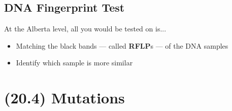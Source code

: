 \documentclass[a4paper,12pt]{article}
\begin{document}
\subsection{DNA Fingerprint Test}
At the Alberta level, all you would be tested on is...
\begin{itemize}
    \item{Matching the black bands --- called \textbf{RFLP}s --- of the DNA samples}
    \item{Identify which sample is more similar}
\end{itemize}

\section{(20.4) Mutations}
\end{document}
